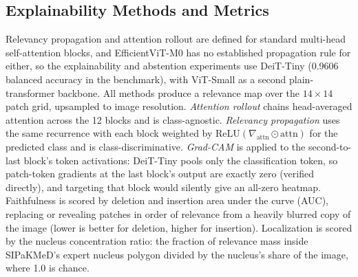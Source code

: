 \documentclass[12pt,letterpaper]{article}
\begin{document}
\subsection{Explainability Methods and Metrics}
\label{sec:xai-methods}
\label{sec:xai-metrics}
Relevancy propagation and attention rollout are defined for standard multi-head self-attention blocks, and EfficientViT-M0 has no established propagation rule for either, so the explainability and abstention experiments use DeiT-Tiny (0.9606 balanced accuracy in the benchmark), with ViT-Small as a second plain-transformer backbone. All methods produce a relevance map over the $14\times14$ patch grid, upsampled to image resolution. \emph{Attention rollout} chains head-averaged attention across the 12 blocks and is class-agnostic. \emph{Relevancy propagation} uses the same recurrence with each block weighted by $\mathrm{ReLU}(\nabla_{\text{attn}} \odot \text{attn})$ for the predicted class and is class-discriminative. \emph{Grad-CAM} is applied to the second-to-last block's token activations: DeiT-Tiny pools only the classification token, so patch-token gradients at the last block's output are exactly zero (verified directly), and targeting that block would silently give an all-zero heatmap. Faithfulness is scored by deletion and insertion area under the curve (AUC),\cite{petsiuk2018rise} replacing or revealing patches in order of relevance from a heavily blurred copy of the image (lower is better for deletion, higher for insertion). Localization is scored by the nucleus concentration ratio: the fraction of relevance mass inside SIPaKMeD's expert nucleus polygon divided by the nucleus's share of the image, where 1.0 is chance.
\end{document}
